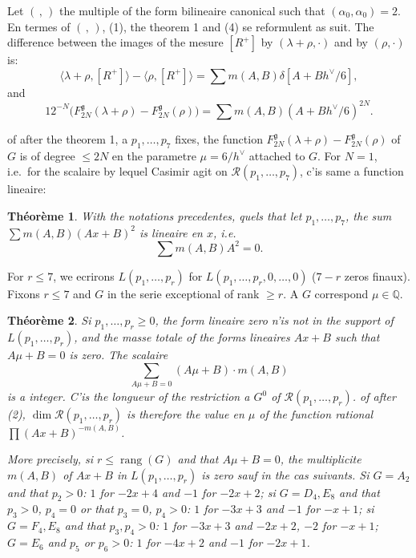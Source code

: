 \documentclass[11pt,a4paper]{article}
\theoremstyle{plain}
\newtheorem{theorem}{Th\'eor\`eme}
\theoremstyle{definition}
\DeclareMathOperator{\rank}{rang}
\newcommand{\rang}{\rank}
\begin{document}
Let $(\, , \,)$ the multiple of the form bilineaire canonical such that $(\alpha_0,\alpha_0) = 2$. En termes of $(\, , \,)$, (1), the theorem 1 and (4) se reformulent as suit. The difference between the images of the mesure $[R^+]$ by $(\lambda + \rho, \cdot)$ and by $(\rho, \cdot)$ is:
\begin{equation}\label{eq:5}
\langle \lambda + \rho, [R^+] \rangle - \langle \rho, [R^+] \rangle = \sum m(A,B)\delta[A + Bh^\vee/6],
\end{equation}
and
\begin{equation}\label{eq:6}
12^{-N} \bigl(F_{2N}^{\mathfrak{g}}(\lambda + \rho) - F_{2N}^{\mathfrak{g}}(\rho)\bigr) = \sum m(A,B)(A + Bh^\vee/6)^{2N}.
\end{equation}

of after the theorem 1, a $p_1,\dots,p_7$ fixes, the function $F_{2N}^{\mathfrak{g}}(\lambda + \rho) - F_{2N}^{\mathfrak{g}}(\rho)$ of $G$ is of degree $\leq 2N$ en the parametre $\mu = 6/h^\vee$ attached to $G$. For $N = 1$, i.e.\ for the scalaire by lequel Casimir agit on $\mathcal{R}(p_1,\dots,p_7)$, c'is same a function lineaire:

\begin{theorem}\label{thm:2}
With the notations precedentes, quels that let $p_1,\dots,p_7$, the sum $\sum m(A,B)(Ax + B)^2$ is lineaire en $x$, i.e.
\begin{equation}\label{eq:7}
\sum m(A,B) A^2 = 0.
\end{equation}
\end{theorem}

For $r \leq 7$, we ecrirons $L(p_1,\dots,p_r)$ for $L(p_1,\dots,p_r,0,\dots,0)$ ($7-r$ zeros finaux). Fixons $r \leq 7$ and $G$ in the serie exceptional of rank $\geq r$. A $G$ correspond $\mu \in \mathbb{Q}$.

\begin{theorem}\label{thm:3}
Si $p_1,\dots,p_r \geq 0$, the form lineaire zero n'is not in the support of $L(p_1,\dots,p_r)$, and the masse totale of the forms lineaires $Ax + B$ such that $A\mu + B = 0$ is zero. The scalaire
\[
\sum_{A\mu + B = 0} (A\mu + B) \cdot m(A,B)
\]
is a integer. C'is the longueur of the restriction a $G^0$ of $\mathcal{R}(p_1,\dots,p_r)$. of after (2), $\dim \mathcal{R}(p_1,\dots,p_r)$ is therefore the value en $\mu$ of the function rational $\prod (Ax + B)^{-m(A,B)}$.

More precisely, si $r \leq \rang(G)$ and that $A\mu + B = 0$, the multiplicite $m(A,B)$ of $Ax + B$ in $L(p_1,\dots,p_r)$ is zero sauf in the cas suivants. Si $G = A_2$ and that $p_2 > 0$: $1$ for $-2x + 4$ and $-1$ for $-2x + 2$; si $G = D_4, E_8$ and that $p_3 > 0$, $p_4 = 0$ or that $p_3 = 0$, $p_4 > 0$: $1$ for $-3x + 3$ and $-1$ for $-x + 1$; si $G = F_4, E_8$ and that $p_3, p_4 > 0$: $1$ for $-3x + 3$ and $-2x + 2$, $-2$ for $-x + 1$; $G = E_6$ and $p_5$ or $p_6 > 0$: $1$ for $-4x + 2$ and $-1$ for $-2x + 1$.
\end{theorem}
\end{document}
